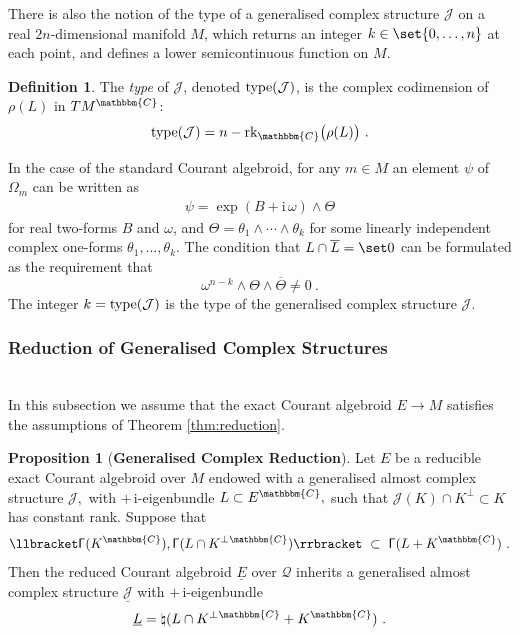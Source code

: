 \documentclass[a4paper, reqno, 11pt]{amsart}
\numberwithin{equation}{section}
\theoremstyle{definition}
\newtheorem{definition}[equation]{Definition}
\newtheorem{proposition}[equation]{Proposition}
\newcommand{\red}[1]{\underline{#1}}
\newcommand{\ii}{\mathrm{i}}
\newcommand{\IC}{\mathbbm{C}}
\newcommand{\cQ}{{\mathcal Q}}
\newcommand{\cJ}{{\mathcal J}}
\theoremstyle{remark}
\begin{document}
There is also the notion of the type of a generalised complex structure $\cJ$ on a real $2n$-dimensional manifold $M$, which returns an integer $k\in \set{0,\dots,n}$ at each point, and defines a lower semicontinuous function on $M$.

\begin{definition}
    The \emph{type} of $\cJ$, denoted ${\rm type}(\cJ)$, is the complex codimension of $\rho(L)$ in $TM^\IC$: $${\rm type}(\cJ) = n - {\rm rk}_\IC\big(\rho(L)\big) \ . $$
\end{definition}

In the case of the standard Courant algebroid, for any $m\in M$ an element $\psi$ of $\Omega_m$ can be written as \cite[Theorem 4.8]{gualtieri:tesi}
\begin{align}
    \psi =  \exp(B+\ii\,\omega) \wedge \Theta
\end{align}
for real two-forms $B$ and $\omega$, and $\Theta = \theta_1 \wedge \cdots \wedge \theta_k$ for some linearly independent complex one-forms $\theta_1 , \ldots , \theta_k$. The condition that $L\cap \overline L = \set 0$ can be formulated as the requirement that $$\omega^{n-k} \wedge \Theta \wedge \overline{\Theta} \neq 0 \ . $$ The integer $k = {\rm type}(\cJ)$ is  the type of the generalised complex structure $\cJ$.

\medskip

\subsubsection{Reduction of Generalised Complex Structures}~\\[5pt]
\label{subsec:gencomplexreduction}
In this subsection we assume that the exact Courant algebroid $E \to M$ satisfies the assumptions of Theorem \ref{thm:reduction}.

\begin{proposition}[\textbf{Generalised Complex Reduction}] \label{prop:reducedcomplexdirac}
Let $E$ be a reducible exact Courant algebroid over $M$ endowed with a generalised almost complex structure $\cJ,$ with $+\,\ii$-eigenbundle $L \subset E^{\IC},$ such that $\cJ(K) \cap K^\perp \subset K$ has constant rank.  Suppose that
\begin{align} \label{eqn:complexdiracred}
\llbracket \mathsf{\Gamma}(K^\IC), \mathsf{\Gamma}(L \cap K^\perp {}^\IC)\rrbracket \ \subset \ \mathsf{\Gamma}(L + K^\IC) \ .
\end{align}
Then the reduced Courant algebroid $\red E$ over $\cQ$ inherits a generalised almost complex structure $\red \cJ$ with $+\,\ii$-eigenbundle $$\red L = \natural(L \cap K^\perp{}^\IC + K^\IC) \ . $$
\end{proposition}
\end{document}

